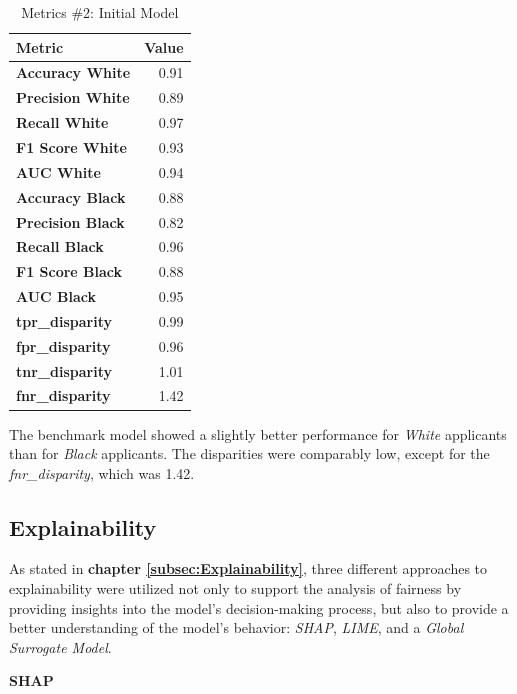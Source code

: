 \begin{table}[h]
    \centering
    \begin{tabular}{lr}
    \toprule
    \textbf{Metric} & \textbf{Value} \\
    \midrule
    \textbf{Accuracy White} & 0.91 \\
    \textbf{Precision White} & 0.89 \\
    \textbf{Recall White} & 0.97 \\
    \textbf{F1 Score White} & 0.93 \\
    \textbf{AUC White} & 0.94 \\
    \midrule
    \textbf{Accuracy Black} & 0.88 \\
    \textbf{Precision Black} & 0.82 \\
    \textbf{Recall Black} & 0.96 \\
    \textbf{F1 Score Black} & 0.88 \\
    \textbf{AUC Black} & 0.95 \\
    \midrule
    \textbf{tpr\_disparity} & 0.99 \\
    \textbf{fpr\_disparity} & 0.96 \\
    \textbf{tnr\_disparity} & 1.01 \\
    \textbf{fnr\_disparity} & 1.42 \\
    \bottomrule
    \end{tabular}
    \caption{Metrics \#2: Initial Model}
    \label{tab:Fairness_Assessment_Initial}
    \small
    The benchmark model showed a slightly better performance for \textit{White} applicants than for \textit{Black} applicants. The disparities were comparably low, except for the \textit{fnr\_disparity}, which was 1.42.
\end{table}

\subsection{Explainability}\label{Explainability Results}

As stated in \textbf{chapter \ref{subsec:Explainability}}, three different approaches to explainability were utilized not only to support the analysis of fairness by providing insights into the model's decision-making process, but also to provide a better understanding of the model's behavior: \textit{SHAP}, \textit{LIME}, and a \textit{Global Surrogate Model}. 

\textbf{SHAP}

